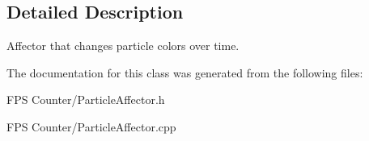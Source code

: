 \subsection{Detailed Description}
Affector that changes particle colors over time. 

The documentation for this class was generated from the following files\+:\begin{DoxyCompactItemize}
\item 
F\+P\+S Counter/Particle\+Affector.\+h\item 
F\+P\+S Counter/Particle\+Affector.\+cpp\end{DoxyCompactItemize}
